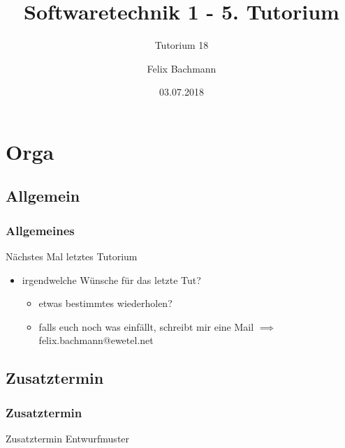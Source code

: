 \documentclass[18pt]{beamer}
\title[SWT1]{Softwaretechnik 1 - 5. Tutorium}
\subtitle{Tutorium 18}
\author{Felix Bachmann}
\date{03.07.2018}
\institute{KIT - Institut für Programmstrukturen und Datenorganisation (IPD)}
\begin{document}
	
	
\begin{frame}
\titlepage
\end{frame}

\begin{frame}
\tableofcontents
\end{frame}


\section{Orga}

	\subsection{Allgemein}
	\begin{frame}
		\frametitle{Allgemeines}
		\begin{alertblock}{Nächstes Mal letztes Tutorium} 
		\begin{itemize}
			\item irgendwelche Wünsche für das letzte Tut?
			\begin{itemize}
				\item etwas bestimmtes wiederholen?
				\item falls euch noch was einfällt, schreibt mir eine Mail
				\linebreak $\implies$ felix.bachmann@ewetel.net
			\end{itemize}
		\end{itemize}
		\end{alertblock}
	\end{frame}



	\subsection{Zusatztermin}
	\begin{frame}
		\frametitle{Zusatztermin}
		\centering \huge Zusatztermin Entwurfmuster
	\end{frame}
\end{document}
